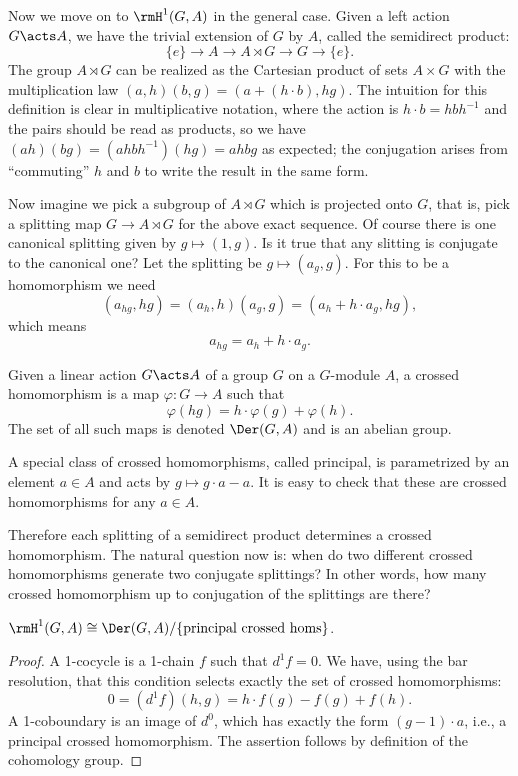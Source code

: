 Now we move on to $\rmH^1(G,A)$ in the general case. Given a left action $G\acts A$, we have the trivial extension of $G$ by $A$, called the semidirect product:
\[\{e\}\to A\to A\rtimes G \to G\to \{e\}.\]
The group $A\rtimes G$ can be realized as the Cartesian product of sets $A\times G$ with the multiplication law $(a,h)(b,g)=(a+(h\cdot b),hg)$. The intuition for this definition is clear in multiplicative notation, where the action is $h\cdot b=hbh^{-1}$ and the pairs should be read as products, so we have $(ah)(bg)=(ahbh^{-1})(hg)=ahbg$ as expected; the conjugation arises from ``commuting'' $h$  and $b$ to write the result in the same form.

Now imagine we pick a subgroup of $A\rtimes G$ which is projected onto $G$, that is, pick a splitting map $G\to A\rtimes G$ for the above exact sequence. Of course there is one canonical splitting given by $g\mapsto (1,g)$. Is it true that any slitting is conjugate to the canonical one? Let the splitting be $g\mapsto (a_g,g)$. For this to be a homomorphism we need
\[ (a_{hg},hg)=(a_h,h)(a_g,g)=(a_h +h\cdot a_g,hg),\]
which means
\[a_{hg}=a_h + h\cdot a_g.\]

\begin{defn}
    Given a linear action $G\acts A$ of a group $G$ on a $G$-module $A$, a crossed homomorphism is a map $\varphi:G\to A$ such that 
    \[\varphi(hg)=h\cdot \varphi(g)+\varphi(h).\]
    The set of all such maps is denoted $\Der(G,A)$ and is an abelian group.
\end{defn}
\begin{defn}
    A special class of crossed homomorphisms, called principal, is parametrized by an element $a\in A$ and acts by $g\mapsto g\cdot a-a$. It is easy to check that these are crossed homomorphisms for any $a\in A$.
\end{defn}

Therefore each splitting of a semidirect product determines a crossed homomorphism. The natural question now is: when do two different crossed homomorphisms generate two conjugate splittings? In other words, how many crossed homomorphism up to conjugation of the splittings are there?

\begin{thm}
$\rmH^1(G,A)\cong \Der(G,A)\slash \{\text{principal crossed homs}\}$.
\end{thm}
\begin{proof}
    A 1-cocycle is a 1-chain $f$ such that $d^1f=0$. We have, using the bar resolution, that this condition selects exactly the set of crossed homomorphisms:
    \[0=(d^1f)(h,g)=h\cdot f(g)-f(g)+f(h).\]
    A 1-coboundary is an image of $d^0$, which has exactly the form $(g-1)\cdot a$, i.e., a principal crossed homomorphism. The assertion follows by definition of the cohomology group.
\end{proof}


